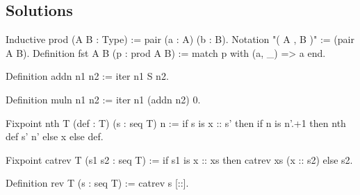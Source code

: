 \subsection{Solutions}

\begin{Answer}[ref=ex:pair]

\begin{coq}{}{}
Inductive prod (A B : Type) := pair (a : A) (b : B).
Notation "( A , B )" := (pair A B).
Definition fst A B (p : prod A B) :=
  match p with (a, _) => a end.
\end{coq}

\end{Answer}

\begin{Answer}[ref=ex:iteradd]

\begin{coq}{}{}
Definition addn n1 n2 := iter n1 S n2.
\end{coq}

\end{Answer}

\begin{Answer}[ref=ex:itermul]

\begin{coq}{}{}
Definition muln n1 n2 := iter n1 (addn n2) 0.
\end{coq}

\end{Answer}

\begin{Answer}[ref=ex:nth]

\begin{coq}{}{}
Fixpoint nth T (def : T) (s : seq T) n :=
  if s is x :: s' then if n is n'.+1 then nth def s' n' else x else def.
\end{coq}

\end{Answer}

\begin{Answer}[ref=ex:rev]

\begin{coq}{}{}
Fixpoint catrev T (s1 s2 : seq T) :=
  if s1 is x :: xs then catrev xs (x :: s2) else s2.

Definition rev T (s : seq T) := catrev s [::].
\end{coq}

\end{Answer}


